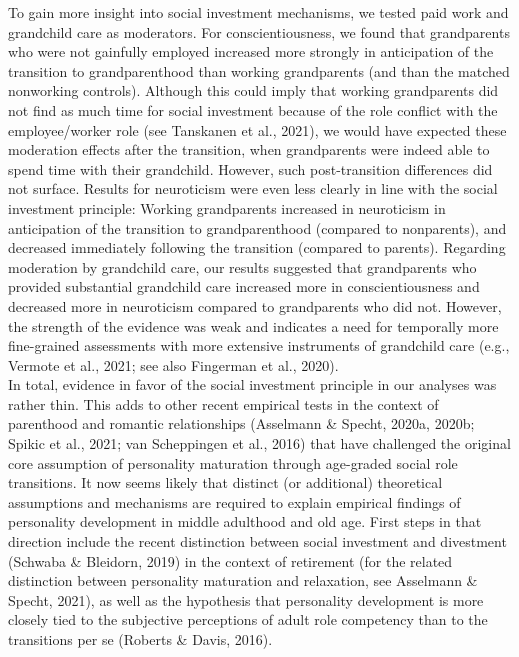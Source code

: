 \documentclass[
  english,
  man, noextraspace,floatsintext]{apa7}
\begin{document}
To gain more insight into social investment mechanisms, we tested paid work and grandchild care as moderators. For conscientiousness, we found that grandparents who were not gainfully employed increased more strongly in anticipation of the transition to grandparenthood than working grandparents (and than the matched nonworking controls). Although this could imply that working grandparents did not find as much time for social investment because of the role conflict with the employee/worker role (see Tanskanen et al., 2021), we would have expected these moderation effects after the transition, when grandparents were indeed able to spend time with their grandchild. However, such post-transition differences did not surface. Results for neuroticism were even less clearly in line with the social investment principle: Working grandparents increased in neuroticism in anticipation of the transition to grandparenthood (compared to nonparents), and decreased immediately following the transition (compared to parents). Regarding moderation by grandchild care, our results suggested that grandparents who provided substantial grandchild care increased more in conscientiousness and decreased more in neuroticism compared to grandparents who did not. However, the strength of the evidence was weak and indicates a need for temporally more fine-grained assessments with more extensive instruments of grandchild care (e.g., Vermote et al., 2021; see also Fingerman et al., 2020).\\
In total, evidence in favor of the social investment principle in our analyses was rather thin. This adds to other recent empirical tests in the context of parenthood and romantic relationships (Asselmann \& Specht, 2020a, 2020b; Spikic et al., 2021; van Scheppingen et al., 2016) that have challenged the original core assumption of personality maturation through age-graded social role transitions. It now seems likely that distinct (or additional) theoretical assumptions and mechanisms are required to explain empirical findings of personality development in middle adulthood and old age. First steps in that direction include the recent distinction between social investment and divestment (Schwaba \& Bleidorn, 2019) in the context of retirement (for the related distinction between personality maturation and relaxation, see Asselmann \& Specht, 2021), as well as the hypothesis that personality development is more closely tied to the subjective perceptions of adult role competency than to the transitions per se (Roberts \& Davis, 2016).\\
\end{document}
